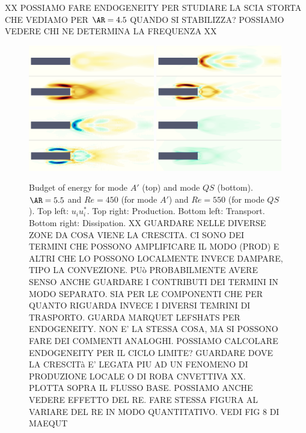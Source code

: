 XX POSSIAMO FARE ENDOGENEITY PER STUDIARE LA SCIA STORTA CHE VEDIAMO PER $\AR=4.5$ QUANDO SI STABILIZZA? POSSIAMO VEDERE CHI NE DETERMINA LA FREQUENZA XX

\begin{figure}
  \centering
  \includegraphics[width=0.49\textwidth]{./fig/AR5s/Ener_AR5p5_Re450_Re550_beta2.png}
  \includegraphics[width=0.49\textwidth]{./fig/AR5s/Prod_AR5p5_Re450_Re550_beta2.png}
  \includegraphics[width=0.49\textwidth]{./fig/AR5s/Trsp_AR5p5_Re450_Re550_beta2.png}
  \includegraphics[width=0.49\textwidth]{./fig/AR5s/Diss_AR5p5_Re450_Re550_beta2.png}
  \caption{Budget of energy for mode $A'$ (top) and mode $QS$ (bottom). $\AR=5.5$ and $Re=450$ (for mode $A'$) and $Re=550$ (for mode $QS$). Top left: $u_i u_i^*$. Top right: Production. Bottom left: Transport. Bottom right: Dissipation. XX GUARDARE NELLE DIVERSE ZONE DA COSA VIENE LA CRESCITA. CI SONO DEI TERMINI CHE POSSONO AMPLIFICARE IL MODO (PROD) E ALTRI CHE LO POSSONO LOCALMENTE INVECE DAMPARE, TIPO LA CONVEZIONE. PUò PROBABILMENTE AVERE SENSO ANCHE GUARDARE I CONTRIBUTI DEI TERMINI IN MODO SEPARATO. SIA PER LE COMPONENTI CHE PER QUANTO RIGUARDA INVECE I DIVERSI TEMRINI DI TRASPORTO. GUARDA MARQUET LEFSHATS PER ENDOGENEITY. NON E' LA STESSA COSA, MA SI POSSONO FARE DEI COMMENTI ANALOGHI. POSSIAMO CALCOLARE ENDOGENEITY PER IL CICLO LIMITE? GUARDARE DOVE LA CRESCITà E' LEGATA PIU AD UN FENOMENO DI PRODUZIONE LOCALE O DI ROBA CNVETTIVA XX. PLOTTA SOPRA IL FLUSSO BASE. POSSIAMO ANCHE VEDERE EFFETTO DEL RE. FARE STESSA FIGURA AL VARIARE DEL RE IN MODO QUANTITATIVO. VEDI FIG 8 DI MAEQUT}
  \label{fig:budget_ener}
\end{figure}


